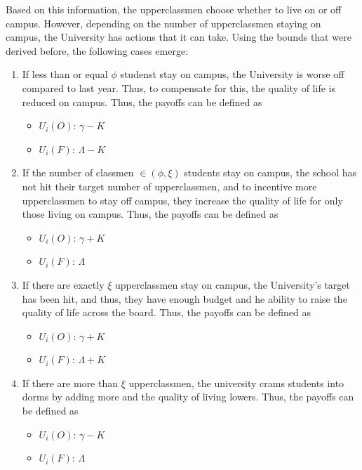 \documentclass[12pt]{article}
\begin{document}
Based on this information, the upperclassmen choose whether to live on or off campus.
However, depending on the number of upperclassmen staying on campus, the University has actions that it can take. Using the bounds that were derived before, the following cases emerge:
\begin{enumerate}
    \item If less than or equal $\phi$ studenst stay on campus, the University is worse off compared to last year. Thus, to compensate for this, the quality of life is reduced on campus. Thus, the payoffs can be defined as \begin{itemize}
        \item $U_i(O)$: $\gamma - K$
        \item $U_i(F)$: $\Lambda - K$
    \end{itemize}
    \item If the number of classmen  $ \in (\phi,\xi)$ students stay on campus, the school has not hit their target number of upperclassmen, and to incentive more upperclassmen to stay off campus, they increase the quality of life for only those living on campus. Thus, the payoffs can be defined as \begin{itemize}
        \item $U_i(O)$: $\gamma + K$
        \item $U_i(F)$: $\Lambda$
    \end{itemize}
    \item If there are exactly $\xi$ upperclassmen stay on campus, the University's target has been hit, and thus, they have enough budget and he ability to raise the quality of life across the board. Thus, the payoffs can be defined as \begin{itemize}
        \item $U_i(O)$: $\gamma + K$
        \item $U_i(F)$: $\Lambda + K$
    \end{itemize}
    \item If there are more than $\xi$ upperclassmen, the university crams students into dorms by adding more and the quality of living lowers. Thus, the payoffs can be defined as \begin{itemize}
        \item $U_i(O)$: $\gamma - K$
        \item $U_i(F)$: $\Lambda$
    \end{itemize}
\end{enumerate}
\end{document}
